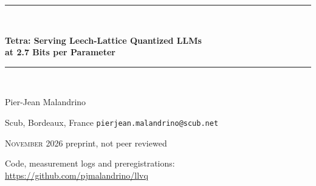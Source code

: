 \documentclass[10pt,letterpaper]{article}
\makeatletter
\newcommand{\Tetra}{\textsc{Tetra}}
\newcommand{\titleblock}{%
  \begingroup\centering
  {\color{okBlue}\rule{\textwidth}{1.2pt}}\\[1.0ex]
  {\LARGE\bfseries Tetra: Serving Leech-Lattice Quantized LLMs\\[2pt]
   at 2.7 Bits per Parameter\par}
  \vspace{1.0ex}
  {\color{okBlue}\rule{\textwidth}{0.5pt}}\\[1.3ex]
  {Pier-Jean Malandrino\par}
  {\footnotesize Scub, Bordeaux, France \;\textperiodcentered\; \texttt{pierjean.malandrino@scub.net}\par}
  \vspace{0.5ex}
  {\footnotesize\textsc{November 2026} \;\textperiodcentered\; preprint, not peer reviewed\par}
  {\footnotesize Code, measurement logs and preregistrations: \url{https://github.com/pjmalandrino/llvq}\par}
  \vspace{1.6ex}\endgroup}
\makeatother
\begin{document}
\titleblock\thispagestyle{plain}

\begin{abstract}
\noindent
Leech-lattice quantization gives good quality at two bits per weight, but its
codebooks hold more than $10^{14}$ points, too many for a lookup table. Our
earlier kernel expanded the codes at load time and read 4.804 bits per weight
from GPU memory for 2 bits of code. We present \Tetra{}, a new codebook on the
same lattice. A 24-weight block still takes 48 bits, most of which index a
64-state trellis of the Golay code and one shared 16~KiB table. The kernel
decodes a block with six table loads and two small lookups inside the
matrix-vector product, and reads 2.150 bits per weight. For full models, we
retrain one scale per matrix row, store the matrices that lose the most as
4-bit integers, and pay for them with 4-bit embedding tables. Our Qwen3-4B,
8B and 14B files hold 2.73, 2.70 and 2.73 bits per parameter over the whole
model. They score 63.37, 69.58 and 75.66 on the full MMLU test set, 4.76,
4.21 and 2.46 points below 4-bit AWQ at 5.3 to 6.0 bits per parameter, and
their WikiText-2 perplexity is 2.8 to 8.0\,\% above FP16's. On GSM8K, through
the kernel, they lose 9.63, 4.62 and 3.26 points to FP16. A persistent kernel
runs each token in one launch and returns the same tokens as one launch per
matrix. With it the files generate 221.5, 142.5 and 86.3 tokens per second on one
NVIDIA L40S. Against llama.cpp's IQ2\_S at the same bits per parameter, on the
same card, our files score 9.08, 4.13 and 2.89 MMLU points higher. llama.cpp
decodes 33.5 to 63.9 tokens per second faster and holds less card memory after
a long prompt. On an A100, launched once per matrix, our files decode slower
than FP16 in vLLM. We preregistered the main experiments.
\end{abstract}














\appendix

\end{document}
